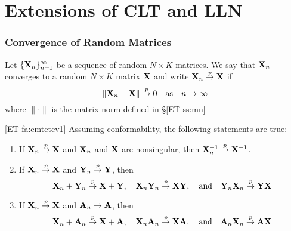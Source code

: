 \section{Extensions of CLT and LLN}

\begin{frame}\frametitle{Convergence of Random Matrices}

    \vspace{2em}
    Let $\{\mathbf X_n\}_{n=1}^{\infty}$ be a sequence of random
    $N \times K$ matrices.  We say that $\mathbf X_n$ converges to a random $N
    \times K$ matrix $\mathbf X$  and write $\mathbf X_n \stackrel { p } {\to}
    \mathbf X$ if 
    \begin{equation*}
        \| \mathbf X_n - \mathbf X \| \stackrel { p } {\to} 0
        \quad \text{as} \quad n \to \infty
    \end{equation*}
    where $\| \cdot \|$ is the matrix norm defined in \S\ref{ET-ss:mn}
    
\end{frame}

\begin{frame}

    \vspace{2em}
    \Fact\eqref{ET-fa:cmtetcv1}
    Assuming conformability, the following statements are true:
    \begin{enumerate}
        \item If $\mathbf X_n \stackrel { p } {\to} \mathbf X$ and $\mathbf X_n$ and $\mathbf X$ are 
            nonsingular, then $\mathbf X_n^{-1} \stackrel { p } {\to} \mathbf X^{-1}$.
        \item If $\mathbf X_n \stackrel { p } {\to} \mathbf X$ and $\mathbf Y_n \stackrel { p } {\to} \mathbf Y$, then
            \begin{equation*}
                \mathbf X_n + \mathbf Y_n \stackrel { p } {\to} \mathbf X + \mathbf Y,
                \quad
                \mathbf X_n \mathbf Y_n \stackrel { p } {\to} \mathbf X \mathbf Y,
                \quad \text{and} \quad
                \mathbf Y_n \mathbf X_n \stackrel { p } {\to} \mathbf Y \mathbf X
            \end{equation*}
        \item If $\mathbf X_n \stackrel { p } {\to} \mathbf X$ and $\mathbf A_n \to \mathbf A$, then
            \begin{equation*}
                \mathbf X_n + \mathbf A_n \stackrel { p } {\to} \mathbf X + \mathbf A,
                \quad
                \mathbf X_n \mathbf A_n \stackrel { p } {\to} \mathbf X \mathbf A,
                \quad \text{and} \quad
                \mathbf A_n \mathbf X_n \stackrel { p } {\to} \mathbf A \mathbf X
            \end{equation*}
     \seti        %
    \end{enumerate}
    
\end{frame}

